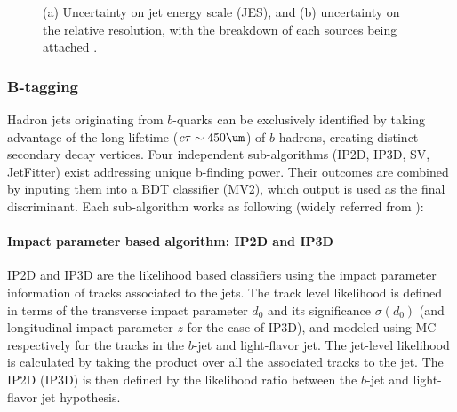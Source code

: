 \begin{figure}[h]
  \centering
    \caption{ (a) Uncertainty on jet energy scale (JES), and (b) uncertainty on the relative resolution, with the breakdown of each sources being attached \cite{144_JESmeas_2015data}.
      \label{fig::objDef::JERUnct2015_pt_144} }
\end{figure}



\subsubsection{B-tagging} \label{sec::objDef::jets::btag}
Hadron jets originating from $b$-quarks can be exclusively identified 
by taking advantage of the long lifetime ($c\tau\sim 450\um$) of $b$-hadrons,
creating distinct secondary decay vertices. 
Four independent sub-algorithms (IP2D, IP3D, SV, JetFitter) exist addressing unique b-finding power. 
Their outcomes are combined by inputing them into a BDT classifier (MV2), which output is used as the final discriminant. Each sub-algorithm works as following (widely referred from \cite{150_bTag_Run2_exp} \cite{151_bTag_Run2_perf} \cite{bTag_Run2_2015data}): 

\paragraph{Impact parameter based algorithm: IP2D and IP3D}
IP2D and IP3D are the likelihood based classifiers using the impact parameter information of tracks associated to the jets. 
The track level likelihood is defined in terms of the transverse impact parameter $d_0$ and its significance $\sigma(d_0)$ (and longitudinal impact parameter $z$ for the case of IP3D), and modeled using MC respectively for the tracks in the $b$-jet and light-flavor jet. The jet-level likelihood is calculated by taking the product over all the associated tracks to the jet.
The IP2D (IP3D) is then defined by the likelihood ratio between the $b$-jet and light-flavor jet hypothesis.


